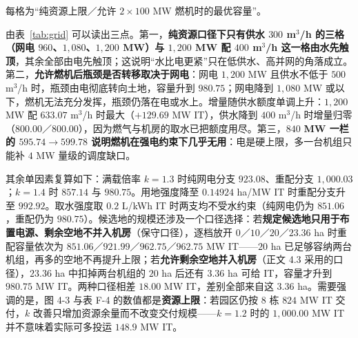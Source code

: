 \noindent 每格为“纯资源上限／允许 $2\times100$ MW 燃机时的最优容量”。

由表~\ref{tab:grid} 可以读出三点。第一，\textbf{纯资源口径下只有供水 $300$ m$^3$/h 的三格（网电 $960$、$1{,}080$、$1{,}200$ MW）与 $1{,}200$ MW 配 $400$ m$^3$/h 这一格由水先触顶}，其余全部由电先触顶；这说明“水比电更紧”只在低供水、高并网的角落成立。第二，\textbf{允许燃机后瓶颈是否转移取决于网电}：网电 $1{,}200$ MW 且供水不低于 $500$ m$^3$/h 时，瓶颈由电彻底转向土地，容量升到 $980.75$；网电降到 $1{,}080$ MW 或以下，燃机无法充分发挥，瓶颈仍落在电或水上。增量随供水额度单调上升：$1{,}200$ MW 配 $633.07$ m$^3$/h 时最大（$+129.69$ MW IT），供水降到 $400$ m$^3$/h 时增量归零（$800.00$／$800.00$），因为燃气与机房的取水已把额度用尽。第三，$840$\textbf{ MW 一栏的 $595.74\to599.78$ 说明燃机在强电约束下几乎无用}：电是硬上限，多一台机组只能补 $4$ MW 量级的调度缺口。

其余单因素复算如下：满载倍率 $k=1.3$ 时纯网电分支 $923.08$、重配分支 $1{,}000.03$；$k=1.4$ 时 $857.14$ 与 $980.75$。用地强度降至 $0.14924$ ha/MW IT 时重配分支升至 $992.92$。取水强度取 $0.2$ L/kWh IT 时两支均不受水约束（纯网电仍为 $851.06$，重配仍为 $980.75$）。候选地的规模还涉及一个口径选择：若\textbf{规定候选地只用于布置电源、剩余空地不并入机房}（保守口径），逐档放开 $0$／$10$／$20$／$23.36$ ha 时重配容量依次为 $851.06$／$921.99$／$962.75$／$962.75$ MW IT——$20$ ha 已足够容纳两台机组，再多的空地不再提升上限；若\textbf{允许剩余空地并入机房}（正文 4.3 采用的口径），$23.36$ ha 中扣掉两台机组的 $20$ ha 后还有 $3.36$ ha 可给 IT，容量才升到 $980.75$ MW IT。两种口径相差 $18.00$ MW IT，差别全部来自这 $3.36$ ha。需要强调的是，图 4-3 与表 F-4 的数值都是\textbf{资源上限}：若园区仍按 8 栋 $824$ MW IT 交付，$k$ 改善只增加资源余量而不改变交付规模——$k=1.2$ 时的 $1{,}000.00$ MW IT 并不意味着实际可多投运 $148.9$ MW IT。




